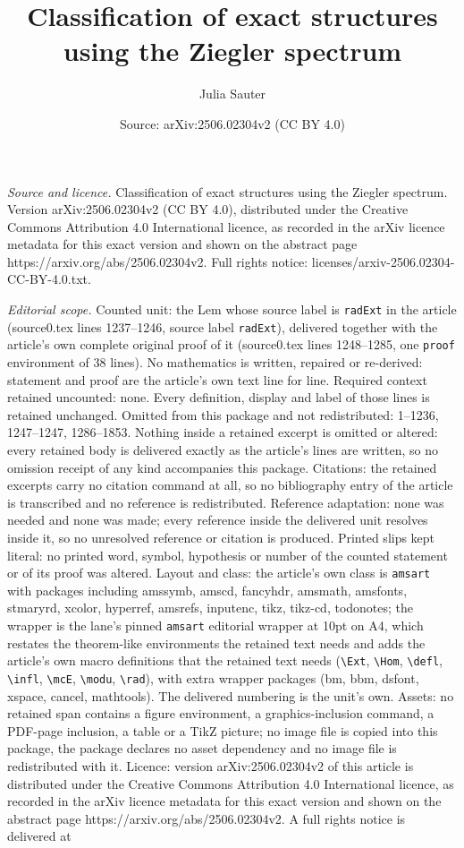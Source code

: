 \documentclass[10pt,a4paper]{amsart}
\title[Classification of exact structures using the Ziegler spectru]{Classification of exact structures using the Ziegler spectrum}
\author{Julia Sauter}
\date{Source: arXiv:2506.02304v2 (CC BY 4.0)}
\begin{document}
\maketitle

\noindent\emph{Source and licence.} Classification of exact structures using the Ziegler spectrum. Version arXiv:2506.02304v2 (CC BY 4.0), distributed under the Creative Commons Attribution 4.0 International licence, as recorded in the arXiv licence metadata for this exact version and shown on the abstract page https://arxiv.org/abs/2506.02304v2. Full rights notice: licenses/arxiv-2506.02304-CC-BY-4.0.txt.\par\smallskip

\noindent\textit{Editorial scope.} Counted unit: the Lem whose source label is \texttt{radExt} in the article (source0.tex lines 1237--1246, source label \texttt{radExt}), delivered together with the article's own complete original proof of it (source0.tex lines 1248--1285, one \texttt{proof} environment of 38 lines). No mathematics is written, repaired or re-derived: statement and proof are the article's own text line for line. Required context retained uncounted: none. Every definition, display and label of those lines is retained unchanged. Omitted from this package and not redistributed: 1--1236, 1247--1247, 1286--1853. Nothing inside a retained excerpt is omitted or altered: every retained body is delivered exactly as the article's lines are written, so no omission receipt of any kind accompanies this package. Citations: the retained excerpts carry no citation command at all, so no bibliography entry of the article is transcribed and no reference is redistributed. Reference adaptation: none was needed and none was made; every reference inside the delivered unit resolves inside it, so no unresolved reference or citation is produced. Printed slips kept literal: no printed word, symbol, hypothesis or number of the counted statement or of its proof was altered. Layout and class: the article's own class is \texttt{amsart} with packages including amssymb, amscd, fancyhdr, amsmath, amsfonts, stmaryrd, xcolor, hyperref, amsrefs, inputenc, tikz, tikz-cd, todonotes; the wrapper is the lane's pinned \texttt{amsart} editorial wrapper at 10pt on A4, which restates the theorem-like environments the retained text needs and adds the article's own macro definitions that the retained text needs (\texttt{\textbackslash Ext}, \texttt{\textbackslash Hom}, \texttt{\textbackslash defl}, \texttt{\textbackslash infl}, \texttt{\textbackslash mcE}, \texttt{\textbackslash modu}, \texttt{\textbackslash rad}), with extra wrapper packages (bm, bbm, dsfont, xspace, cancel, mathtools). The delivered numbering is the unit's own. Assets: no retained span contains a figure environment, a graphics-inclusion command, a PDF-page inclusion, a table or a TikZ picture; no image file is copied into this package, the package declares no asset dependency and no image file is redistributed with it. Licence: version arXiv:2506.02304v2 of this article is distributed under the Creative Commons Attribution 4.0 International licence, as recorded in the arXiv licence metadata for this exact version and shown on the abstract page https://arxiv.org/abs/2506.02304v2. A full rights notice is delivered at 
\end{document}

